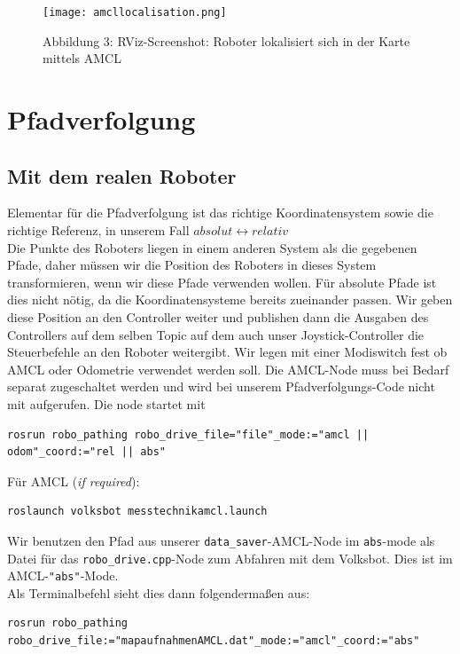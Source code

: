 \documentclass[11pt,a4paper]{article}
\begin{document}
\begin{figure}[H]
  \caption*{Abbildung 3: RViz-Screenshot: Roboter lokalisiert sich in der Karte mittels AMCL}
  \texttt{[image: amcllocalisation.png]}
  \centering
\end{figure}

\section{Pfadverfolgung}
\subsection*{Mit dem realen Roboter}
Elementar für die Pfadverfolgung ist das richtige Koordinatensystem sowie die richtige Referenz, in unserem Fall $absolut \leftrightarrow relativ$ \\
Die Punkte des Roboters liegen in einem anderen System als die gegebenen Pfade, daher müssen
wir die Position des Roboters in dieses System transformieren, wenn wir diese Pfade verwenden wollen. 
Für absolute Pfade ist dies nicht nötig, da die Koordinatensysteme bereits zueinander passen. 
Wir geben diese Position an den Controller weiter und publishen dann die Ausgaben des Controllers auf dem 
selben Topic auf dem auch unser Joystick-Controller die Steuerbefehle an den Roboter weitergibt. 
Wir legen mit einer Modiswitch fest ob AMCL oder Odometrie verwendet werden soll. Die AMCL-Node muss 
bei Bedarf separat zugeschaltet werden und wird bei unserem Pfadverfolgungs-Code nicht mit aufgerufen.
Die node startet mit \begin{verbatim}
rosrun robo_pathing robo_drive_file="file"_mode:="amcl || odom"_coord:="rel || abs"
\end{verbatim}
Für AMCL (\textit{if required}):
\begin{verbatim}
roslaunch volksbot messtechnikamcl.launch
\end{verbatim}
Wir benutzen den Pfad aus unserer \verb|data_saver|-AMCL-Node im \texttt{abs}-mode als Datei
für das \verb|robo_drive.cpp|-Node zum Abfahren mit dem Volksbot. Dies ist im AMCL-\texttt{"abs"}-Mode. \\
Als Terminalbefehl sieht dies dann folgendermaßen aus:
\begin{verbatim}
rosrun robo_pathing robo_drive_file:="mapaufnahmenAMCL.dat"_mode:="amcl"_coord:="abs"
\end{verbatim}
\end{document}
